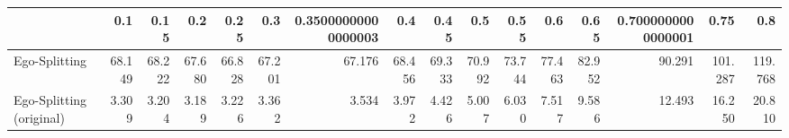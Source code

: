 \begin{tabular}{lrrrrrrrrrrrrrrr}
\toprule
{} &    0.1 &   0.15 &    0.2 &   0.25 &    0.3 & 0.35000000000000003 &    0.4 &   0.45 &    0.5 &   0.55 &    0.6 &   0.65 & 0.7000000000000001 &    0.75 &     0.8 \\
\midrule
Ego-Splitting            & 68.149 & 68.222 & 67.680 & 66.828 & 67.201 &              67.176 & 68.456 & 69.333 & 70.992 & 73.744 & 77.463 & 82.952 &             90.291 & 101.287 & 119.768 \\
Ego-Splitting (original) &  3.309 &  3.204 &  3.189 &  3.226 &  3.362 &               3.534 &  3.972 &  4.426 &  5.007 &  6.030 &  7.517 &  9.586 &             12.493 &  16.250 &  20.810 \\
\bottomrule
\end{tabular}
